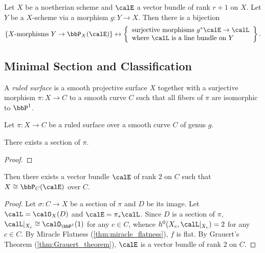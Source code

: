    \begin{proposition}\label{prop:relative_projective_morphism}
        Let \(X\) be a noetherian scheme and \(\calE\) a vector bundle of rank \(r+1\) on \(X\). 
        Let \(Y\) be a \(X\)-scheme via a morphism \(g:Y \to X\).
        Then there is a bijection
        \[
            \{X\text{-morphisms } Y \to \bbP_X(\calE)\}
            \leftrightarrow
            \left\{
                \begin{array}{l}
                    \text{surjective morphisms } g^*\calE \to \calL \\
                    \text{where } \calL \text{ is a line bundle on } Y
                \end{array}
            \right\}.
        \]
    \end{proposition}

\subsection{Minimal Section and Classification}

    \begin{definition}\label{def:ruled_surface}
        A \emph{ruled surface} is a smooth projective surface \(X\) together with a surjective morphism \(\pi:X \to C\) to a smooth curve \(C\) such that all fibers of \(\pi\) are isomorphic to \(\bbP^1\).
    \end{definition}

    Let \(\pi:X \to C\) be a ruled surface over a smooth curve \(C\) of genus \(g\).


    \begin{lemma}\label{lem:existence_of_section_of_ruled_surface}
        There exists a section of \(\pi\).
    \end{lemma}
    \begin{proof}
        
    \end{proof}

    \begin{proposition}\label{prop:ruled_surface_as_projective_bundle}
        Then there exists a vector bundle \(\calE\) of rank \(2\) on \(C\) such that \(X \cong \bbP_C(\calE)\) over \(C\).
    \end{proposition}
    \begin{proof}
        Let \(\sigma:C \to X\) be a section of \(\pi\) and \(D\) be its image.
        Let \(\calL = \calO_X(D)\) and \(\calE = \pi_*\calL\).
        Since \(D\) is a section of \(\pi\), \(\calL|_{X_c} \cong \calO_{\bbP^1}(1)\) for any \(c \in C\), whence \(h^0(X_c,\calL|_{X_c}) = 2\) for any \(c \in C\).
        By Miracle Flatness (\cref{thm:miracle_flatness}), \(f\) is flat.
        By Grauert's Theorem (\cref{thm:Grauert_theorem}), \(\calE\) is a vector bundle of rank \(2\) on \(C\).
    \end{proof}


